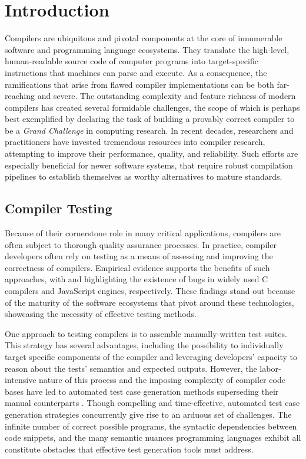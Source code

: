 \chapter{\label{cha:intro}Introduction}

Compilers are ubiquitous and pivotal components
at the core of innumerable software and programming language ecosystems.
They translate the high-level, human-readable source code
of computer programs into target-specific instructions that machines
can parse and execute.
As a consequence, the ramifications that arise from flawed
compiler implementations can be both far-reaching and severe.
The outstanding complexity and feature richness of modern compilers has created
several formidable challenges, the scope of which is perhaps best exemplified
by \citet{hoare2003verifying}
declaring the task of building a provably correct compiler to be a 
\textit{Grand Challenge} in computing research.
In recent decades, researchers and practitioners
have invested tremendous resources
into compiler research, attempting to improve their
performance, quality, and reliability. 
Such efforts are especially beneficial for newer software systems,
that require robust compilation pipelines to establish themselves
as worthy alternatives to mature standards.


\section{Compiler Testing}

Because of their cornerstone role in many critical applications,
compilers are often subject to thorough quality assurance processes.
In practice, compiler developers often rely on testing as a means
of assessing and improving the correctness of compilers.
Empirical evidence supports the benefits of such approaches,
with \citet{sun2016toward} and \citet{holler2012fuzzing} highlighting
the existence of bugs in widely used C compilers and JavaScript engines, respectively. 
These findings stand out because of the maturity of the
software ecosystems that pivot around these technologies, showcasing
the necessity of effective testing methods.

One approach to testing compilers is to assemble manually-written test suites.
This strategy has several advantages, including the possibility to individually
target specific components of the compiler and leveraging developers' capacity to
reason about the tests' semantics and expected outputs.
However, the labor-intensive nature of this process and 
the imposing complexity of compiler code bases have
led to automated test case generation methods superseding their 
manual counterparts \citep{chen2020survey, zhao2009automated}.
Though compelling and time-effective, automated test case
generation strategies concurrently give rise to an arduous set of challenges.
The infinite number of correct possible programs,
the syntactic dependencies between code snippets,
and the many semantic nuances programming languages exhibit all constitute
obstacles that effective test generation tools must address.

